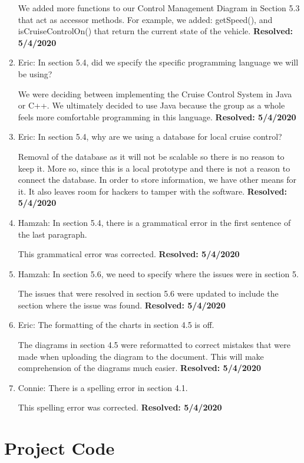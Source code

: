 \documentclass[preprint,11pt,3p]{article}
\begin{document}
\begin{enumerate}
			We added more functions to our Control Management Diagram in Section 5.3 that act as accessor methods. For example, we added: getSpeed(), and isCruiseControlOn() that return the current state of the vehicle. \textbf{Resolved: 5/4/2020}
	\item Eric: In section 5.4, did we specify the specific programming language we will be using?\par
			We were deciding between implementing the Cruise Control System in Java or C++. We ultimately decided to use Java because the group as a whole feels more comfortable programming in this language. \textbf{Resolved: 5/4/2020}
	\item Eric: In section 5.4, why are we using a database for local cruise control?\par
			Removal of the database as it will not be scalable so there is no reason to keep it. More so, since this is a local prototype and there is not a reason to connect the database. In order to store information, we have other means for it. It also leaves room for hackers to tamper with the software. \textbf{Resolved: 5/4/2020}
	\item Hamzah: In section 5.4, there is a grammatical error in the first sentence of the last paragraph.\par
			This grammatical error was corrected. \textbf{Resolved: 5/4/2020}
	\item Hamzah: In section 5.6, we need to specify where the issues were in section 5.\par
			The issues that were resolved in section 5.6 were updated to include the section where the issue was found. \textbf{Resolved: 5/4/2020}
	\item Eric: The formatting of the charts in section 4.5 is off.\par
			The diagrams in section 4.5 were reformatted to correct mistakes that were made when uploading the diagram to the document. This will make comprehension of the diagrams much easier. \textbf{Resolved: 5/4/2020}
	\item Connie: There is a spelling error in section 4.1.\par
			This spelling error was corrected. \textbf{Resolved: 5/4/2020}
\end{enumerate}

\newpage
\section{Project Code}

	
\end{document}
